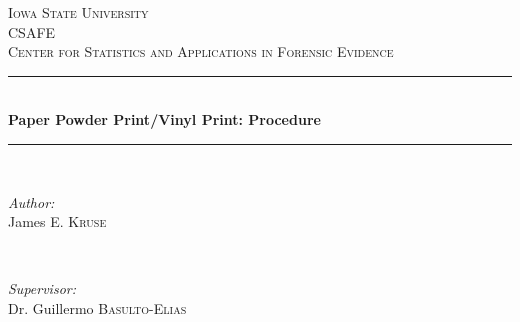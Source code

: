 \begin{titlepage}

\newcommand{\HRule}{\rule{\linewidth}{0.5mm}} %

\center %
 

\textsc{\LARGE Iowa State University}\\[1.5cm] %
\textsc{\Large CSAFE}\\[0.5cm] %
\textsc{\large Center for Statistics and Applications in Forensic Evidence }\\[0.5cm] %


\HRule \\[0.4cm]
{ \huge \bfseries Paper Powder Print/Vinyl Print: Procedure }\\[0.4cm] %
\HRule \\[1.5cm]
 

\begin{minipage}{0.4\textwidth}
\begin{flushleft} \large
\emph{Author:}\\
James \textsc{E. Kruse} %
\end{flushleft}
\end{minipage}
~
\begin{minipage}{0.4\textwidth}
\begin{flushright} \large
\emph{Supervisor:} \\
Dr. Guillermo \textsc{Basulto-Elias} %
\end{flushright}
\end{minipage}\\[2cm]


\end{titlepage}
